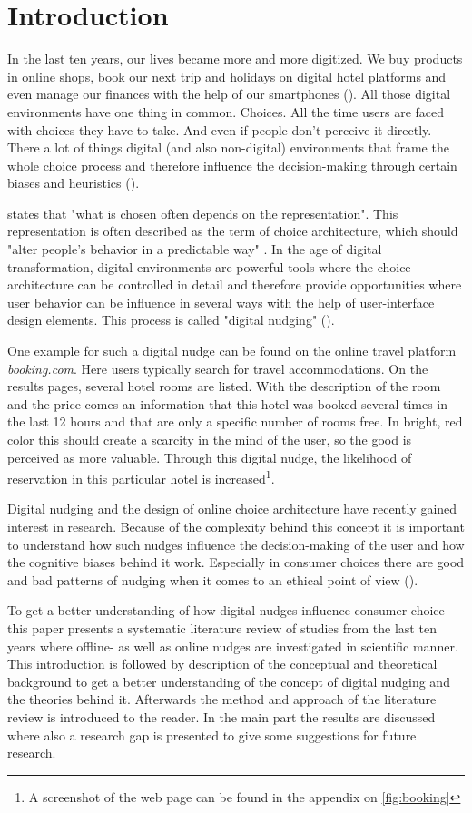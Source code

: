 \section{Introduction}
In the last ten years, our lives became more and more digitized. We buy products in online shops, book our next trip and holidays on digital hotel platforms and even manage our finances with the help of our smartphones (\cite{schneider_digital_2018}). All those digital environments have one thing in common. Choices. All the time users are faced with choices they have to take. And even if people don't perceive it directly. There a lot of things digital (and also non-digital) environments that frame the whole choice process and therefore influence the decision-making through certain biases and heuristics (\cite{tversky_judgment_1974}). 

\cite{johnson_beyond_2012} states that "what is chosen often depends on the representation". This representation is often described as the term of choice architecture, which should "alter people's behavior in a predictable way" \cite{thaler_nudge:_2009}. In the age of digital transformation, digital environments are powerful tools where the choice architecture can be controlled in detail and therefore provide opportunities where user behavior can be influence in several ways with the help of user-interface design elements. This process is called "digital nudging" (\cite{weinmann_digital_2016}).

One example for such a digital nudge can be found on the online travel platform \textit{booking.com}. Here users typically search for travel accommodations. On the results pages, several hotel rooms are listed. With the description of the room and the price comes an information that this hotel was booked several times in the last 12 hours and that are only a specific number of rooms free. In bright, red color this should create a scarcity in the mind of the user, so the good is perceived as more valuable. Through this digital nudge, the likelihood of reservation in this particular hotel is increased\footnote{A screenshot of the web page can be found in the appendix on \ref{fig:booking}}.

Digital nudging and the design of online choice architecture have recently gained interest in research. Because of the complexity behind this concept it is important to understand how such nudges influence the decision-making of the user and how the cognitive biases behind it work. Especially in consumer choices there are good and bad patterns of nudging when it comes to an ethical point of view (\cite{sunstein_nudging_2015}).

To get a better understanding of how digital nudges influence consumer choice this paper presents a systematic literature review of studies from the last ten years where offline- as well as online nudges are investigated in scientific manner. This introduction is followed by description of the conceptual and theoretical background to get a better understanding of the concept of digital nudging and the theories behind it. Afterwards the method and approach of the literature review is introduced to the reader. In the main part the results are discussed where also a research gap is presented to give some suggestions for future research.
